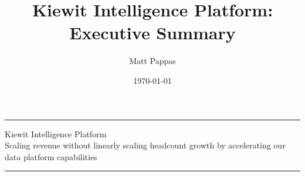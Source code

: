 \documentclass[12pt, a4paper]{article}
\title{Kiewit Intelligence Platform: Executive Summary}
\author{Matt Pappas}
\date{\today}
\begin{document}
     \pagestyle{plain}
     \renewcommand{\thepage}{\arabic{page}}
     
     \thispagestyle{plain}

 \begin{center}
     \noindent\rule{\linewidth}{2pt}
     
     \vspace{0.15em}
     
     {\large Kiewit Intelligence Platform} \\[0.1em]
     {\small Scaling revenue without linearly scaling headcount growth by accelerating our data platform capabilities}

     
     \vspace{0.15em}
     
     \noindent\rule{\linewidth}{2pt}
 \end{center}

 \vspace{0.05em}
\end{document}
